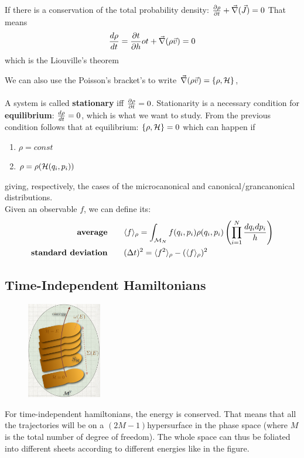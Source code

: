 If there is a conservation of the total probability density: $\frac{\partial\rho}{\partial t} + \vec\nabla(\vec J) = 0$
That means 
$$ \frac{d\rho}{dt} = \frac{\partial t}{\partial h}o t + \vec \nabla(\rho \vec v) = 0$$
which is the Liouville's theorem

We can also use the Poisson's bracket's to write $\vec\nabla(\rho \vec v) = \{\rho, \mathcal{H}\}$,\\ 
\\

\Def A system is called \textbf{stationary} iff $\frac{\partial\rho}{\partial t} = 0$. Stationarity is a necessary condition for \textbf{equilibrium}: $\frac{d\rho}{dt} = 0$, which is what we want to study. From the previous condition follows that at equilibrium: $\{\rho,\mathcal{H}\} = 0$ which can happen if
\begin{enumerate}
    \item $\rho = const$
    \item $\rho = \rho(\mathcal{H}(q_i,p_i))$
\end{enumerate}
giving, respectively, the cases of the microcanonical and canonical/grancanonical distributions.\\

\Def Given an observable $f$, we can define its: 
\begin{align*}  
\text{\textbf{average}} \qquad& \langle f\rangle_\rho = \int_{\mathcal{M}_N} f(q_i, p_i) \rho (q_i,p_i) \left(\prod_{i=1}^N \frac {dq_idp_i}h\right) \\
\text{\textbf{standard deviation}} \qquad & (\Delta t)^2 = \langle f^2 \rangle_\rho - (\langle f\rangle_\rho)^2
\end{align*}

\subsection{Time-Independent Hamiltonians}
\begin{figure}
    \centering
    \includegraphics[width=0.29\textwidth]{images/foliated space.png}
\end{figure}
For time-independent hamiltonians, the energy is conserved. That means that all the trajectories will be on a $(2M-1)$hypersurface in the phase space (where $M$ is the total number of degree of freedom). The whole space can thus be foliated into different sheets according to different energies like in the figure.


